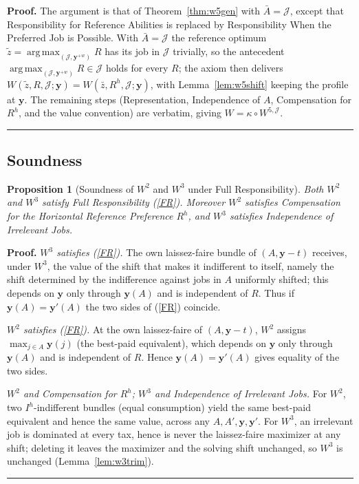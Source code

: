\documentclass[12pt,thmsb]{article}
\DeclareMathOperator*{\argmax}{arg\,max}
\newtheorem{proposition}{Proposition}
\newenvironment{proof}[1][Proof]{\noindent \textbf{#1.} }{\  \rule{0.5em}{0.5em}}
\begin{document}
\begin{proof}
The argument is that of Theorem~\ref{thm:w5gen} with $\bar A=\mathcal J$, except
that Responsibility for Reference Abilities is replaced by Responsibility When
the Preferred Job is Possible. With $\bar A=\mathcal J$ the reference optimum
$\tilde z=\argmax_{(\mathcal J,\mathbf y^{+w})}R$ has its job in $\mathcal J$
trivially, so the antecedent $\argmax_{(\mathcal J,\mathbf y^{+w})}R\in\mathcal
J$ holds for every $R$; the axiom then delivers
$W(\tilde z,R,\mathcal J;\mathbf y)=W(\bar z,R^h,\mathcal J;\mathbf y)$, with
Lemma~\ref{lem:w5shift} keeping the profile at $\mathbf y$. The remaining steps
(Representation, Independence of $A$, Compensation for $R^h$, and the value
convention) are verbatim, giving $W=\kappa\circ W^{5,\mathcal J}$.
\end{proof}


\subsection{Soundness}

\begin{proposition}[Soundness of $W^2$ and $W^3$ under Full Responsibility]
\label{prop:fr_sound}
Both $W^2$ and $W^3$ satisfy Full Responsibility (\ref{FR}). Moreover $W^2$
satisfies Compensation for the Horizontal Reference Preference $R^h$, and $W^3$
satisfies Independence of Irrelevant Jobs.
\end{proposition}

\begin{proof}
\emph{$W^3$ satisfies (\ref{FR}).} The own laissez-faire bundle of
$(A,\mathbf y-t)$ receives, under $W^3$, the value of the shift that makes it
indifferent to itself, namely the shift determined by the indifference against
jobs in $A$ uniformly shifted; this depends on $\mathbf y$ only through
$\mathbf y(A)$ and is independent of $R$. Thus if $\mathbf y(A)=\mathbf y'(A)$
the two sides of (\ref{FR}) coincide.

\emph{$W^2$ satisfies (\ref{FR}).} At the own laissez-faire of
$(A,\mathbf y-t)$, $W^2$ assigns $\max_{j\in A}\mathbf y(j)$ (the best-paid
equivalent), which depends on $\mathbf y$ only through $\mathbf y(A)$ and is
independent of $R$. Hence $\mathbf y(A)=\mathbf y'(A)$ gives equality of the two
sides.

\emph{$W^2$ and Compensation for $R^h$; $W^3$ and Independence of Irrelevant
Jobs.} For $W^2$, two $I^h$-indifferent bundles (equal consumption) yield the
same best-paid equivalent and hence the same value, across any $A,A',\mathbf
y,\mathbf y'$. For $W^3$, an irrelevant job is dominated at every tax, hence is
never the laissez-faire maximizer at any shift; deleting it leaves the maximizer
and the solving shift unchanged, so $W^3$ is unchanged
(Lemma~\ref{lem:w3trim}).
\end{proof}
\end{document}
